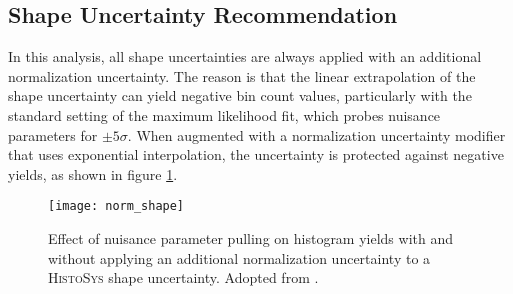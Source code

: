 \subsection{Shape Uncertainty Recommendation}
In this analysis, all shape uncertainties are always applied with an additional normalization uncertainty. The reason is that the linear extrapolation of the shape uncertainty can yield negative bin count values, particularly with the standard setting of the maximum likelihood fit, which probes nuisance parameters for $\pm5\sigma$. When augmented with a normalization uncertainty modifier that uses exponential interpolation, the uncertainty is protected against negative yields, as shown in figure \ref{fig:norm_shape}.

\begin{figure}
    \centering
    \texttt{[image: norm\_shape]}
    \caption[]{Effect of nuisance parameter pulling on histogram yields with and without applying an additional normalization uncertainty to a \textsc{HistoSys} shape uncertainty. Adopted from \citep{held_stat_intro}.}
    \label{fig:norm_shape}
\end{figure}


